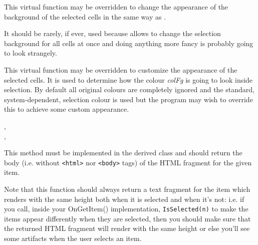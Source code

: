 \label{wxhtmllistboxgetselectedtextbgcolour}


This virtual function may be overridden to change the appearance of the
background of the selected cells in the same way as
.

It should be rarely, if ever, used because
 allows to
change the selection background for all cells at once and doing anything more
fancy is probably going to look strangely.




\label{wxhtmllistboxgetselectedtextcolour}


This virtual function may be overridden to customize the appearance of the
selected cells. It is used to determine how the colour {\it colFg} is going to
look inside selection. By default all original colours are completely ignored
and the standard, system-dependent, selection colour is used but the program
may wish to override this to achieve some custom appearance.


,\\
,\\


\label{wxhtmllistboxongetitem}


This method must be implemented in the derived class and should return
the body (i.e. without {\tt <html>} nor {\tt <body>} tags) of the HTML fragment
for the given item.

Note that this function should always return a text fragment for the  item
which renders with the same height both when it is selected and when it's not:
i.e. if you call, inside your OnGetItem() implementation, {\tt IsSelected(n)} to
make the items appear differently when they are selected, then you should make sure
that the returned HTML fragment will render with the same height or else you'll
see some artifacts when the user selects an item.

